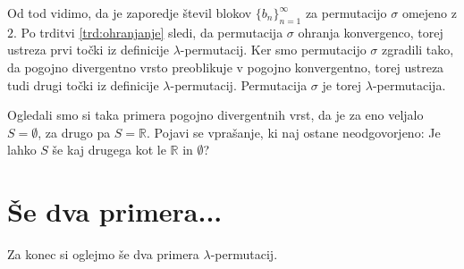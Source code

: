 \documentclass[12pt,a4paper,reqno]{amsart}
\theoremstyle{definition} %
\theoremstyle{plain} %
\newcommand{\R}{\mathbb R}
\begin{document}
Od tod vidimo, da je zaporedje števil blokov $\{b_n\}_{n=1}^{\infty}$ za permutacijo $\sigma$ omejeno z $2$. %
Po trditvi \ref{trd:ohranjanje} sledi, da permutacija $\sigma$ ohranja konvergenco, torej ustreza prvi točki iz definicije $\lambda$-permutacij. Ker smo permutacijo $\sigma$ zgradili tako, da pogojno divergentno vrsto preoblikuje v pogojno konvergentno, torej ustreza tudi drugi točki iz definicije $\lambda$-permutacij. Permutacija $\sigma$ je torej $\lambda$-permutacija.

Ogledali smo si taka primera pogojno divergentnih vrst, da je za eno veljalo $S=\emptyset$, za drugo pa $S=\R$. Pojavi se vprašanje, ki naj ostane neodgovorjeno: Je lahko $S$ še kaj drugega kot le $\R$ in $\emptyset$?

\section{Še dva primera...}

Za konec si oglejmo še dva primera $\lambda$-permutacij.
\end{document}

